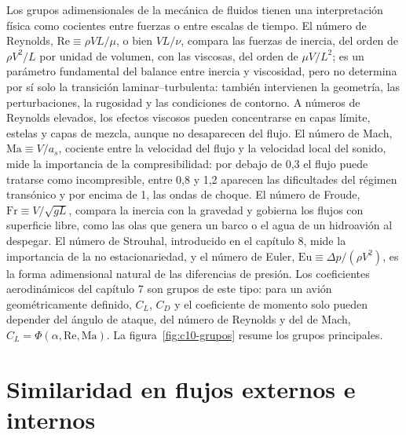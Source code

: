 \documentclass[10pt,openany]{book}
\begin{document}
Los grupos adimensionales de la mecánica de fluidos tienen una interpretación física como cocientes entre fuerzas o entre escalas de tiempo. El número de Reynolds, \(\mathrm{Re} \equiv \rho V L/\mu\), o bien \(VL/\nu\), compara las fuerzas de inercia, del orden de \(\rho V^{2}/L\) por unidad de volumen, con las viscosas, del orden de \(\mu V/L^{2}\); es un parámetro fundamental del balance entre inercia y viscosidad, pero no determina por sí solo la transición laminar--turbulenta: también intervienen la geometría, las perturbaciones, la rugosidad y las condiciones de contorno. A números de Reynolds elevados, los efectos viscosos pueden concentrarse en capas límite, estelas y capas de mezcla, aunque no desaparecen del flujo. El número de Mach, \(\mathrm{Ma} \equiv V/a_s\), cociente entre la velocidad del flujo y la velocidad local del sonido, mide la importancia de la compresibilidad: por debajo de 0,3 el flujo puede tratarse como incompresible, entre 0,8 y 1,2 aparecen las dificultades del régimen transónico y por encima de 1, las ondas de choque. El número de Froude, \(\mathrm{Fr} \equiv V/\sqrt{gL}\), compara la inercia con la gravedad y gobierna los flujos con superficie libre, como las olas que genera un barco o el agua de un hidroavión al despegar. El número de Strouhal, introducido en el capítulo 8, mide la importancia de la no estacionariedad, y el número de Euler, \(\mathrm{Eu} \equiv \Delta p/(\rho V^{2})\), es la forma adimensional natural de las diferencias de presión. Los coeficientes aerodinámicos del capítulo 7 son grupos de este tipo: para un avión geométricamente definido, \(C_L\), \(C_D\) y el coeficiente de momento solo pueden depender del ángulo de ataque, del número de Reynolds y del de Mach, \(C_L = \Phi(\alpha, \mathrm{Re}, \mathrm{Ma})\). La figura~\ref{fig:c10-grupos} resume los grupos principales.

\section{Similaridad en flujos externos e internos}
\end{document}
